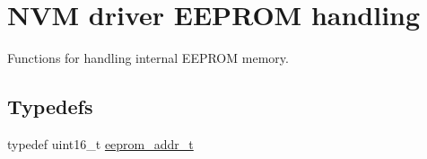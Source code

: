 \hypertarget{group__nvm__eeprom__group}{\section{N\-V\-M driver E\-E\-P\-R\-O\-M handling}
\label{group__nvm__eeprom__group}
}


Functions for handling internal E\-E\-P\-R\-O\-M memory.  


\subsection*{Typedefs}
\begin{DoxyCompactItemize}
\item 
typedef uint16\-\_\-t \hyperlink{group__nvm__eeprom__group_ga9adfe2ae9400336ec4a715b2db1c3e79}{eeprom\-\_\-addr\-\_\-t}
\end{DoxyCompactItemize}
